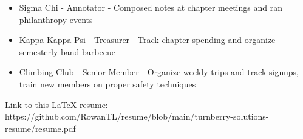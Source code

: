 \documentclass[11pt]{article}
\begin{document}
\begin{itemize}[noitemsep, topsep=0pt, partopsep=0pt, parsep=0pt, itemsep=0pt]
    \small
    \item Sigma Chi - Annotator - Composed notes at chapter meetings and ran philanthropy events
    \item Kappa Kappa Psi - Treasurer - Track chapter spending and organize semesterly band barbecue
    \item Climbing Club - Senior Member - Organize weekly trips and track signups, train new members on proper safety techniques
\end{itemize}

\begin{center}
    \tiny{Link to this LaTeX resume: https://github.com/RowanTL/resume/blob/main/turnberry-solutions-resume/resume.pdf}
\end{center}
\end{document}
